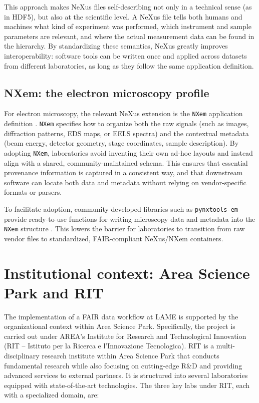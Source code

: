 This approach makes NeXus files self-describing not only in a technical sense (as in HDF5), but also at the scientific level. 
A NeXus file tells both humans and machines what kind of experiment was performed, which instrument and sample parameters are relevant, and where the actual measurement data can be found in the hierarchy. 
By standardizing these semantics, NeXus greatly improves interoperability: software tools can be written once and applied across datasets from different laboratories, as long as they follow the same application definition.

\subsection{NXem: the electron microscopy profile}

For electron microscopy, the relevant NeXus extension is the \texttt{NXem} application definition \parencite{bazzocchiNexusEM,nexusEMStructure}. 
\texttt{NXem} specifies how to organize both the raw signals (such as images, diffraction patterns, EDS maps, or EELS spectra) and the contextual metadata (beam energy, detector geometry, stage coordinates, sample description). 
By adopting \texttt{NXem}, laboratories avoid inventing their own ad-hoc layouts and instead align with a shared, community-maintained schema. 
This ensures that essential provenance information is captured in a consistent way, and that downstream software can locate both data and metadata without relying on vendor-specific formats or parsers.

To facilitate adoption, community-developed libraries such as \texttt{pynxtools-em} provide ready-to-use functions for writing microscopy data and metadata into the \texttt{NXem} structure \parencite{pynxtools_nexus_validation}. 
This lowers the barrier for laboratories to transition from raw vendor files to standardized, FAIR-compliant NeXus/NXem containers.

\section{Institutional context: Area Science Park and RIT}

The implementation of a FAIR data workflow at LAME is supported by the organizational context within Area Science Park. Specifically, the project is carried out under AREA’s Institute for Research and Technological Innovation (RIT – Istituto per la Ricerca e l’Innovazione Tecnologica). RIT is a multi-disciplinary research institute within Area Science Park that conducts fundamental research while also focusing on cutting-edge R\&D and providing advanced services to external partners. It is structured into several laboratories equipped with state-of-the-art technologies. The three key labs under RIT, each with a specialized domain, are:

